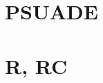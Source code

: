 

\maketitle
\tableofcontents

\newpage

\section{PSUADE}















\newpage

\section{R, RC}




